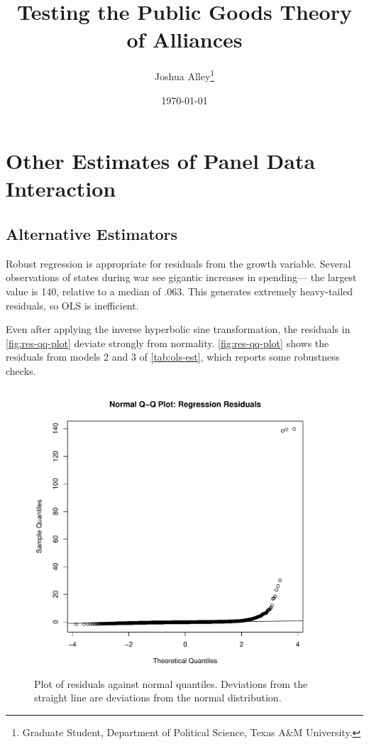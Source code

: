 \documentclass[12pt]{article}
\title{
\textbf{Testing the Public Goods Theory of Alliances}
	}
\author{Joshua Alley\footnote{Graduate Student,
Department of Political Science, Texas A\&M University.}}
\date{{\normalsize \today}}
\begin{document}
\maketitle 

\doublespace



\section{Other Estimates of Panel Data Interaction}


\subsection{Alternative Estimators}

Robust regression is appropriate for residuals from the growth variable. 
Several observations of states during war see gigantic increases in spending--- the largest value is 140, relative to a median of .063. 
This generates extremely heavy-tailed residuals, so OLS is inefficient. 


Even after applying the inverse hyperbolic sine transformation, the residuals in \autoref{fig:res-qq-plot} deviate strongly from normality. 
\autoref{fig:res-qq-plot} shows the residuals from models 2 and 3 of \autoref{tab:ols-est}, which reports some robustness checks.

\begin{figure}[htbp]
	\centering
		\includegraphics[width=0.95\textwidth]{res-qq-plot.pdf}
	\caption{Plot of residuals against normal quantiles. Deviations from the straight line are deviations from the normal distribution.}
	\label{fig:res-qq-plot}
\end{figure}
\end{document}
